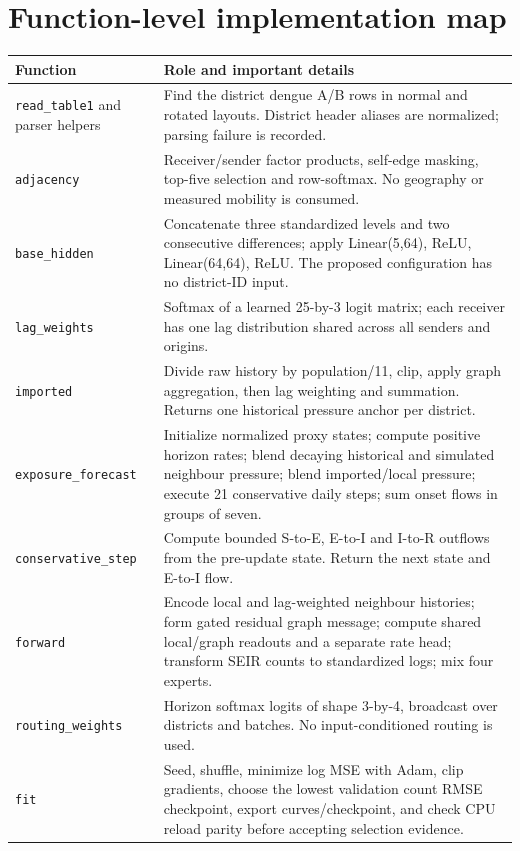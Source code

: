 \documentclass[11pt]{article}
\begin{document}
\section{Function-level implementation map}
\begin{longtable}{p{}p{}}\toprule Function & Role and important details\\\midrule
\texttt{read\_table1} and parser helpers & Find the district dengue A/B rows in normal and rotated layouts. District header aliases are normalized; parsing failure is recorded.\\
\texttt{adjacency} & Receiver/sender factor products, self-edge masking, top-five selection and row-softmax. No geography or measured mobility is consumed.\\
\texttt{base\_hidden} & Concatenate three standardized levels and two consecutive differences; apply Linear(5,64), ReLU, Linear(64,64), ReLU. The proposed configuration has no district-ID input.\\
\texttt{lag\_weights} & Softmax of a learned 25-by-3 logit matrix; each receiver has one lag distribution shared across all senders and origins.\\
\texttt{imported} & Divide raw history by population/11, clip, apply graph aggregation, then lag weighting and summation. Returns one historical pressure anchor per district.\\
\texttt{exposure\_forecast} & Initialize normalized proxy states; compute positive horizon rates; blend decaying historical and simulated neighbour pressure; blend imported/local pressure; execute 21 conservative daily steps; sum onset flows in groups of seven.\\
\texttt{conservative\_step} & Compute bounded S-to-E, E-to-I and I-to-R outflows from the pre-update state. Return the next state and E-to-I flow.\\
\texttt{forward} & Encode local and lag-weighted neighbour histories; form gated residual graph message; compute shared local/graph readouts and a separate rate head; transform SEIR counts to standardized logs; mix four experts.\\
\texttt{routing\_weights} & Horizon softmax logits of shape 3-by-4, broadcast over districts and batches. No input-conditioned routing is used.\\
\texttt{fit} & Seed, shuffle, minimize log MSE with Adam, clip gradients, choose the lowest validation count RMSE checkpoint, export curves/checkpoint, and check CPU reload parity before accepting selection evidence.\\

\end{longtable}
\end{document}
